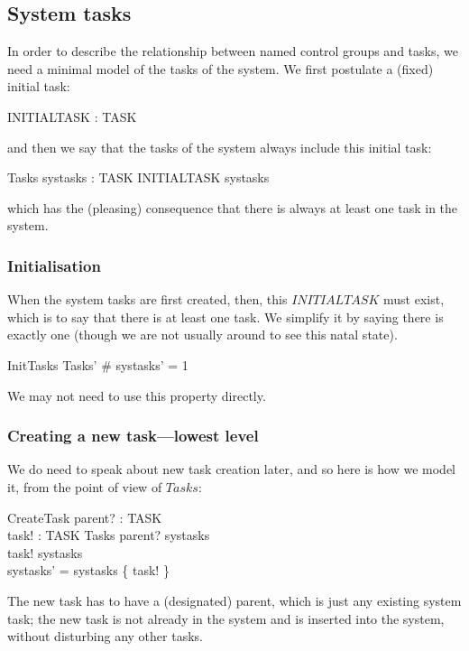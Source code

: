 \documentclass[a4paper,twoside,12pt]{article}
\begin{document}
\subsection{System tasks}
In order to describe the relationship between named control groups and tasks, we need a minimal model of the tasks of the system. We first postulate a (fixed) initial task:

\begin{axdef}{}
INITIALTASK : TASK
\end{axdef}
and then we say that the tasks of the system always include this initial task:

\begin{schema}{Tasks}
systasks : \finset TASK
\where
INITIALTASK \in systasks
\end{schema}
which has the (pleasing) consequence that there is always at least one task in the system.

\subsubsection{Initialisation}

When the system tasks are first created, then, this $INITIALTASK$ must exist, which is to say that there is at least one task. 
We simplify it by saying there is exactly one (though we are not usually around to see this natal state).

\begin{schema}{InitTasks}
Tasks'
\where
\# systasks' = 1
\end{schema}
We may not need to use this property directly.

\subsubsection{Creating a new task---lowest level}

We do need to speak about new task creation later, and so here is how we model it, from the point of view of $Tasks$:

\begin{schema}{CreateTask}
parent? : TASK \\
task! : TASK
\also
\Delta Tasks
\where
parent? \in systasks \\
task! \notin systasks \\
systasks' = systasks \cup \{ task! \}
\end{schema}
The new task has to have a (designated) parent, which is just any existing system task; the new task is not already
in the system and is inserted into the system, without disturbing any other tasks.
\end{document}
